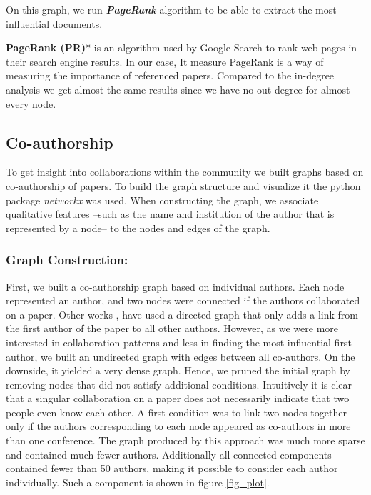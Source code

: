 \documentclass[article,twocolumn]{IEEEtran}
\begin{document}
On this graph, we run \textbf{\emph{PageRank}} algorithm to be able to
extract the most influential documents.

\textbf{PageRank (PR)}* is an algorithm used by Google Search to rank
web pages in their search engine results. In our case, It measure
PageRank is a way of measuring the importance of referenced papers.
Compared to the in-degree analysis we get almost the same results since
we have no out degree for almost every node.



    \hypertarget{co-authorship}{%
\subsection{Co-authorship}\label{co-authorship}}

To get insight into collaborations within the community we built graphs
based on co-authorship of papers. To build the graph structure and
visualize it the python package \emph{networkx} was used. When
constructing the graph, we associate qualitative features --such as the
name and institution of the author that is represented by a node-- to
the nodes and edges of the graph.

\hypertarget{graph-construction}{%
\subsubsection{Graph Construction:}\label{graph-construction}}

First, we built a co-authorship graph based on individual authors. Each
node represented an author, and two nodes were connected if the authors
collaborated on a paper. Other works \cite{cheong2009social},
\cite{hesford2006management} have used a directed graph that only adds a
link from the first author of the paper to all other authors. However,
as we were more interested in collaboration patterns and less in finding
the most influential first author, we built an undirected graph with
edges between all co-authors. On the downside, it yielded a very dense
graph. Hence, we pruned the initial graph by removing nodes that did not
satisfy additional conditions. Intuitively it is clear that a singular
collaboration on a paper does not necessarily indicate that two people
even know each other. A first condition was to link two nodes together
only if the authors corresponding to each node appeared as co-authors in
more than one conference. The graph produced by this approach was much
more sparse and contained much fewer authors. Additionally all connected
components contained fewer than 50 authors, making it possible to
consider each author individually. Such a component is shown in figure
\ref{fig_plot}.
\end{document}
